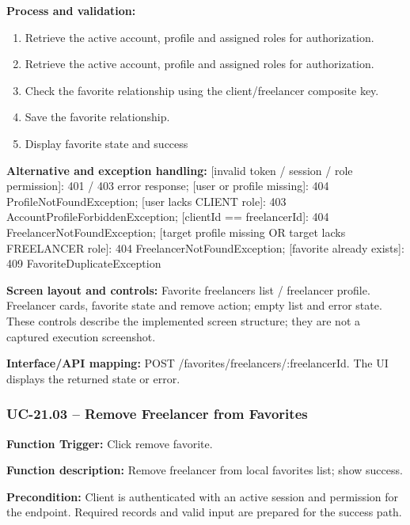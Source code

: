 \textbf{Process and validation:}
\begin{enumerate}
\item Retrieve the active account, profile and assigned roles for authorization.
\item Retrieve the active account, profile and assigned roles for authorization.
\item Check the favorite relationship using the client/\allowbreak{}freelancer composite key.
\item Save the favorite relationship.
\item Display favorite state and success
\end{enumerate}
\textbf{Alternative and exception handling:} [invalid token /\allowbreak{} session /\allowbreak{} role permission]: 401 /\allowbreak{} 403 error response; [user or profile missing]: 404 Profile\allowbreak{}Not\allowbreak{}Found\allowbreak{}Exception; [user lacks CLIENT role]: 403 Account\allowbreak{}Profile\allowbreak{}Forbidden\allowbreak{}Exception; [client\allowbreak{}Id =\allowbreak{}=\allowbreak{} freelancer\allowbreak{}Id]: 404 Freelancer\allowbreak{}Not\allowbreak{}Found\allowbreak{}Exception; [target profile missing OR target lacks FREELANCER role]: 404 Freelancer\allowbreak{}Not\allowbreak{}Found\allowbreak{}Exception; [favorite already exists]: 409 Favorite\allowbreak{}Duplicate\allowbreak{}Exception

\textbf{Screen layout and controls:} Favorite freelancers list /\allowbreak{} freelancer profile. Freelancer cards, favorite state and remove action; empty list and error state. These controls describe the implemented screen structure; they are not a captured execution screenshot.

\textbf{Interface/\allowbreak{}API mapping:} POST /\allowbreak{}favorites/\allowbreak{}freelancers/\allowbreak{}:freelancer\allowbreak{}Id. The UI displays the returned state or error.

\subsubsection{UC-21.03 -- Remove Freelancer from Favorites}
\textbf{Function Trigger:} Click remove favorite.

\textbf{Function description:} Remove freelancer from local favorites list; show success.

\textbf{Precondition:} Client is authenticated with an active session and permission for the endpoint. Required records and valid input are prepared for the success path.

